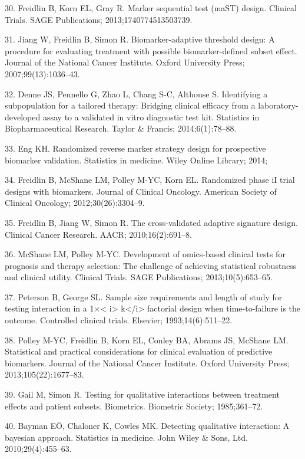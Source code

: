 \documentclass[11pt]{article}
\begin{document}
30. Freidlin B, Korn EL, Gray R. Marker sequential test (maST) design.
Clinical Trials. SAGE Publications; 2013;1740774513503739.

31. Jiang W, Freidlin B, Simon R. Biomarker-adaptive threshold design: A
procedure for evaluating treatment with possible biomarker-defined
subset effect. Journal of the National Cancer Institute. Oxford
University Press; 2007;99(13):1036--43.

32. Denne JS, Pennello G, Zhao L, Chang S-C, Althouse S. Identifying a
subpopulation for a tailored therapy: Bridging clinical efficacy from a
laboratory-developed assay to a validated in vitro diagnostic test kit.
Statistics in Biopharmaceutical Research. Taylor \& Francis;
2014;6(1):78--88.

33. Eng KH. Randomized reverse marker strategy design for prospective
biomarker validation. Statistics in medicine. Wiley Online Library;
2014;

34. Freidlin B, McShane LM, Polley M-YC, Korn EL. Randomized phase iI
trial designs with biomarkers. Journal of Clinical Oncology. American
Society of Clinical Oncology; 2012;30(26):3304--9.

35. Freidlin B, Jiang W, Simon R. The cross-validated adaptive signature
design. Clinical Cancer Research. AACR; 2010;16(2):691--8.

36. McShane LM, Polley M-YC. Development of omics-based clinical tests
for prognosis and therapy selection: The challenge of achieving
statistical robustness and clinical utility. Clinical Trials. SAGE
Publications; 2013;10(5):653--65.

37. Peterson B, George SL. Sample size requirements and length of study
for testing interaction in a 1\(\times\)\textless{} i\textgreater{}
k\textless{}/i\textgreater{} factorial design when time-to-failure is
the outcome. Controlled clinical trials. Elsevier; 1993;14(6):511--22.

38. Polley M-YC, Freidlin B, Korn EL, Conley BA, Abrams JS, McShane LM.
Statistical and practical considerations for clinical evaluation of
predictive biomarkers. Journal of the National Cancer Institute. Oxford
University Press; 2013;105(22):1677--83.

39. Gail M, Simon R. Testing for qualitative interactions between
treatment effects and patient subsets. Biometrics. Biometric Society;
1985;361--72.

40. Bayman EÖ, Chaloner K, Cowles MK. Detecting qualitative interaction:
A bayesian approach. Statistics in medicine. John Wiley \& Sons, Ltd.
2010;29(4):455--63.
\end{document}
